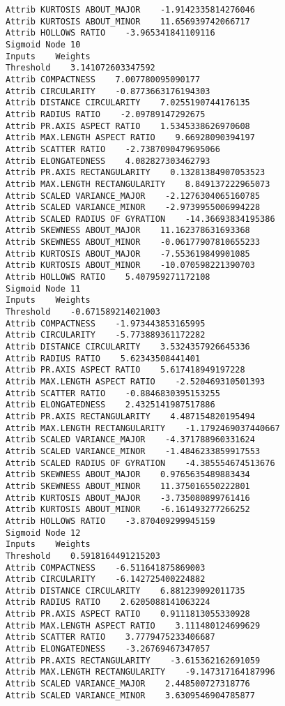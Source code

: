 \documentclass[
	article,			%
	11pt,				%
	oneside,			%
	a4paper,			%
	english,			%
	brazil,				%
	sumario=tradicional
	]{abntex2}
\begin{document}
\begin{lstlisting}
Attrib KURTOSIS ABOUT_MAJOR    -1.9142335814276046
Attrib KURTOSIS ABOUT_MINOR    11.656939742066717
Attrib HOLLOWS RATIO    -3.965341841109116
Sigmoid Node 10
Inputs    Weights
Threshold    3.141072603347592
Attrib COMPACTNESS    7.007780095090177
Attrib CIRCULARITY    -0.8773663176194303
Attrib DISTANCE CIRCULARITY    7.0255190744176135
Attrib RADIUS RATIO    -2.09789147292675
Attrib PR.AXIS ASPECT RATIO    1.5345338626970608
Attrib MAX.LENGTH ASPECT RATIO    9.66928090394197
Attrib SCATTER RATIO    -2.7387090479695066
Attrib ELONGATEDNESS    4.082827303462793
Attrib PR.AXIS RECTANGULARITY    0.13281384907053523
Attrib MAX.LENGTH RECTANGULARITY    8.849137222965073
Attrib SCALED VARIANCE_MAJOR    -2.1276304065160785
Attrib SCALED VARIANCE_MINOR    -2.9739955006994228
Attrib SCALED RADIUS OF GYRATION    -14.36693834195386
Attrib SKEWNESS ABOUT_MAJOR    11.162378631693368
Attrib SKEWNESS ABOUT_MINOR    -0.06177907810655233
Attrib KURTOSIS ABOUT_MAJOR    -7.553619849901085
Attrib KURTOSIS ABOUT_MINOR    -10.070598221390703
Attrib HOLLOWS RATIO    5.407959271172108
Sigmoid Node 11
Inputs    Weights
Threshold    -0.671589214021003
Attrib COMPACTNESS    -1.973443853165995
Attrib CIRCULARITY    -5.773889361172282
Attrib DISTANCE CIRCULARITY    3.5324357926645336
Attrib RADIUS RATIO    5.62343508441401
Attrib PR.AXIS ASPECT RATIO    5.617418949197228
Attrib MAX.LENGTH ASPECT RATIO    -2.520469310501393
Attrib SCATTER RATIO    -0.8846830395153255
Attrib ELONGATEDNESS    2.4325141987517886
Attrib PR.AXIS RECTANGULARITY    4.487154820195494
Attrib MAX.LENGTH RECTANGULARITY    -1.1792469037440667
Attrib SCALED VARIANCE_MAJOR    -4.371788960331624
Attrib SCALED VARIANCE_MINOR    -1.4846233859917553
Attrib SCALED RADIUS OF GYRATION    -4.385554674513676
Attrib SKEWNESS ABOUT_MAJOR    0.9765635489883434
Attrib SKEWNESS ABOUT_MINOR    11.375016550222801
Attrib KURTOSIS ABOUT_MAJOR    -3.735080899761416
Attrib KURTOSIS ABOUT_MINOR    -6.161493277266252
Attrib HOLLOWS RATIO    -3.870409299945159
Sigmoid Node 12
Inputs    Weights
Threshold    0.5918164491215203
Attrib COMPACTNESS    -6.511641875869003
Attrib CIRCULARITY    -6.142725400224882
Attrib DISTANCE CIRCULARITY    6.881239092011735
Attrib RADIUS RATIO    2.6205088141063224
Attrib PR.AXIS ASPECT RATIO    0.9111813055330928
Attrib MAX.LENGTH ASPECT RATIO    3.111480124699629
Attrib SCATTER RATIO    3.7779475233406687
Attrib ELONGATEDNESS    -3.26769467347057
Attrib PR.AXIS RECTANGULARITY    -3.615362162691059
Attrib MAX.LENGTH RECTANGULARITY    -9.147317164187996
Attrib SCALED VARIANCE_MAJOR    2.448500727318776
Attrib SCALED VARIANCE_MINOR    3.6309546904785877

\end{lstlisting}
\end{document}
